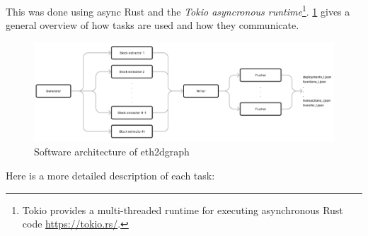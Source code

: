 This was done using async Rust and the \textit{Tokio asyncronous runtime}\footnote{Tokio provides a multi-threaded runtime for executing asynchronous Rust code \url{https://tokio.rs/}.}. \cref{fig:eth2dgraph-architecture} gives a general overview of how tasks are used and how they communicate.

\begin{figure}[H]
  \centering
  \includegraphics[width=1\textwidth]{Figures/methods/software-architecture.jpg}
  \caption[Software architecture of eth2dgraph]{Software architecture of eth2dgraph}
  \label{fig:eth2dgraph-architecture}
\end{figure}

Here is a more detailed description of each task:

